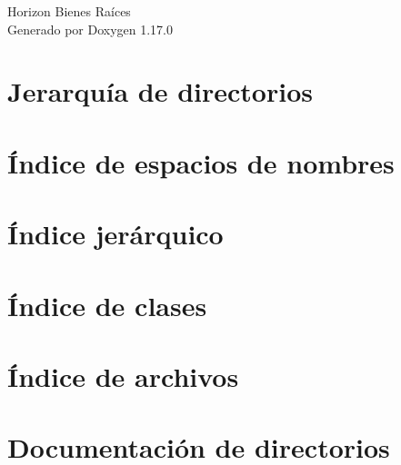 \documentclass[twoside]{book}
\newcommand{\+}{\discretionary{\mbox{\scriptsize$\hookleftarrow$}}{}{}}
\newcommand{\clearemptydoublepage}{%
    \newpage{\pagestyle{empty}\cleardoublepage}%
  }
\begin{document}
  \raggedbottom
    \hypersetup{pageanchor=false,
                bookmarksnumbered=true,
                pdfencoding=unicode
               }
  \begin{titlepage}
  \vspace*{7cm}
  \begin{center}%
  {\Large Horizon Bienes Raíces}\\
  \vspace*{1cm}
  {\large Generado por Doxygen 1.17.0}\\
  \end{center}
  \end{titlepage}
  \clearemptydoublepage
  \tableofcontents
  \clearemptydoublepage
  \hypersetup{pageanchor=true}

\chapter{Jerarquía de directorios}

\chapter{Índice de espacios de nombres}

\chapter{Índice jerárquico}

\chapter{Índice de clases}

\chapter{Índice de archivos}

\chapter{Documentación de directorios}











\end{document}
